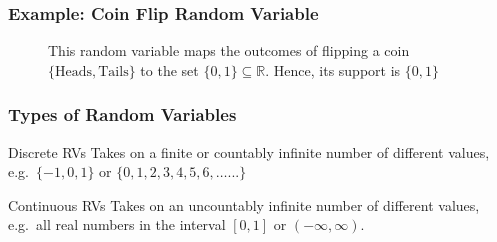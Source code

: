 \documentclass[handout]{beamer}
\begin{document}
\begin{frame}
\frametitle{Example: Coin Flip Random Variable}

\begin{figure}
\centering
{}
\caption{This random variable maps the outcomes of flipping a coin $\{\mbox{Heads}, \mbox{Tails}\}$ to the set $\{0,1\}\subseteq \mathbb{R}$. Hence, its support is $\{0,1\}$}
\end{figure}
\end{frame}
\begin{frame}
\frametitle{Types of Random Variables}
 
	\begin{block}{Discrete RVs}
	Takes on a finite or countably infinite number of different values, e.g.\  $\{-1, 0, 1\}$ or $\{0, 1, 2, 3, 4, 5, 6, \hdots ...\}$
	\end{block}
 	
	\begin{block}{Continuous RVs}
	Takes on an uncountably infinite number of different values, e.g.\ all real numbers in the interval $[0,1]$ or $(-\infty, \infty)$.
	\end{block}

\end{frame}
\end{document}
